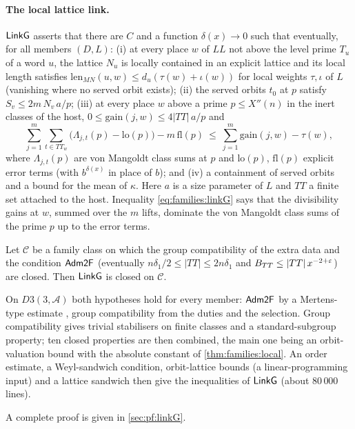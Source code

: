 \paragraph{The local lattice link.}
$\mathsf{LinkG}$ asserts that there are $C$ and a function $\delta(x)\to0$ such that eventually, for all members
$(D,L)$: (i) at every place $w$ of $\mathit{LL}$ not above the level prime $T_u$ of a word $u$, the lattice $N_u$
is locally contained in an explicit lattice and its local length satisfies
$\mathrm{len}_{MN}(u,w)\le d_u(\tau(w)+\iota(w))$ for local weights $\tau,\iota$ of $L$ (vanishing where no
served orbit exists); (ii) the served orbits $t_0$ at $p$ satisfy $S_v\le2m\,N_v\,a/p$; (iii) at every place
$w$ above a prime $p\le X''(n)$ in the inert classes of the host, $0\le\mathrm{gain}(j,w)\le4|TT|\,a/p$ and
\begin{equation}\label{eq:families:linkG}
\sum_{j=1}^{m}\sum_{t\in TT_w}\bigl(\Lambda_{j,t}(p)-\mathrm{lo}(p)\bigr)-m\,\mathrm{fl}(p)
\ \le\ \sum_{j=1}^{m}\mathrm{gain}(j,w)-\tau(w),
\end{equation}
where $\Lambda_{j,t}(p)$ are von Mangoldt class sums at $p$ and $\mathrm{lo}(p)$, $\mathrm{fl}(p)$ explicit error
terms (with $b^{\delta(x)}$ in place of $b$); and (iv) a containment of served orbits and a bound for the mean of
$\kappa$. Here $a$ is a size parameter of $L$ and $TT$ a finite set attached to the host. Inequality
\eqref{eq:families:linkG} says that the divisibility gains at $w$, summed over the $m$ lifts, dominate the
von Mangoldt class sums of the prime $p$ up to the error terms.

\begin{theorem}\Fmark\label{thm:linkG}
Let $\mathcal C$ be a family class on which the group compatibility of the extra data and the condition
$\mathsf{Adm2F}$ (eventually $n\delta_1/2\le|TT|\le2n\delta_1$ and $B_{TT}\le|TT|\,x^{-2+\varepsilon}$) are closed. Then
$\mathsf{LinkG}$ is closed on $\mathcal C$.
\end{theorem}

\begin{proofoutline}
On $D3(3,\mathcal A)$ both hypotheses hold for every member: $\mathsf{Adm2F}$ by a Mertens-type estimate
\cite{Mertens1874}, group compatibility from the duties and the selection. Group compatibility gives trivial
stabilisers on finite classes and a standard-subgroup property; ten closed properties are then combined, the main
one being an orbit-valuation bound with the absolute constant of \cref{thm:families:local}. An order estimate, a
Weyl-sandwich condition, orbit-lattice bounds (a linear-programming input) and a lattice sandwich then give the
inequalities of $\mathsf{LinkG}$ (about $80\,000$ lines).

A complete proof is given in \cref{sec:pf:linkG}.
\end{proofoutline}

